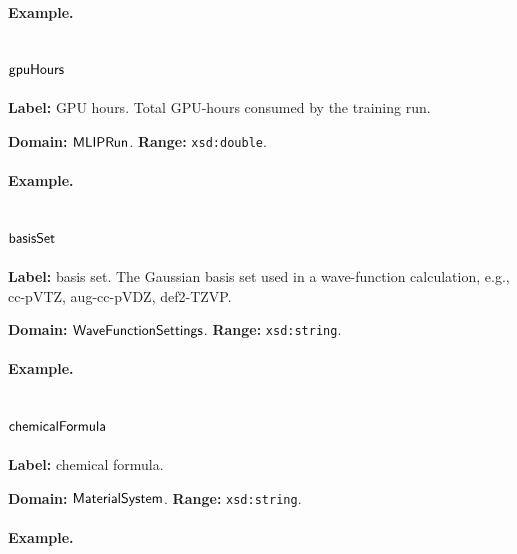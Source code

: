 \paragraph{Example.}

\subsection{$\mathsf{gpuHours}$}
\label{sec:term-gpuHours}

\textbf{Label:} GPU hours.
Total GPU-hours consumed by the training run.

\textbf{Domain:} $\mathsf{MLIPRun}$.
\textbf{Range:} \texttt{xsd:double}.

\paragraph{Example.}

\subsection{$\mathsf{basisSet}$}
\label{sec:term-basisSet}

\textbf{Label:} basis set.
The Gaussian basis set used in a wave-function calculation, e.g., cc-pVTZ, aug-cc-pVDZ, def2-TZVP.

\textbf{Domain:} $\mathsf{WaveFunctionSettings}$.
\textbf{Range:} \texttt{xsd:string}.

\paragraph{Example.}

\subsection{$\mathsf{chemicalFormula}$}
\label{sec:term-chemicalFormula}

\textbf{Label:} chemical formula.

\textbf{Domain:} $\mathsf{MaterialSystem}$.
\textbf{Range:} \texttt{xsd:string}.

\paragraph{Example.}

